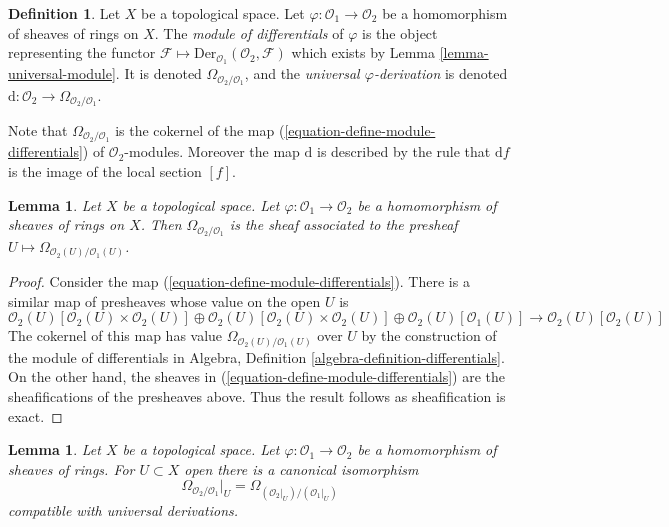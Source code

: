 \documentclass{stacks-project}
\theoremstyle{plain}
\newtheorem{lemma}[subsection]{Lemma}
\theoremstyle{definition}
\newtheorem{definition}[subsection]{Definition}
\theoremstyle{remark}
\numberwithin{equation}{subsection}
\begin{document}
\begin{definition}
\label{definition-module-differentials}
Let $X$ be a topological space. Let $\varphi : \mathcal{O}_1 \to \mathcal{O}_2$
be a homomorphism of sheaves of rings on $X$. The {\it module of differentials}
of $\varphi$ is the object representing the functor
$\mathcal{F} \mapsto \text{Der}_{\mathcal{O}_1}(\mathcal{O}_2, \mathcal{F})$
which exists by Lemma \ref{lemma-universal-module}.
It is denoted $\Omega_{\mathcal{O}_2/\mathcal{O}_1}$, and the {\it universal
$\varphi$-derivation} is denoted
$\text{d} : \mathcal{O}_2 \to \Omega_{\mathcal{O}_2/\mathcal{O}_1}$.
\end{definition}

\noindent
Note that $\Omega_{\mathcal{O}_2/\mathcal{O}_1}$ is the cokernel of
the map (\ref{equation-define-module-differentials}) of
$\mathcal{O}_2$-modules. Moreover the map $\text{d}$ is described
by the rule that $\text{d}f$ is the image of the local section $[f]$.

\begin{lemma}
\label{lemma-differentials-sheafify}
Let $X$ be a topological space. Let $\varphi : \mathcal{O}_1 \to \mathcal{O}_2$
be a homomorphism of sheaves of rings on $X$. Then
$\Omega_{\mathcal{O}_2/\mathcal{O}_1}$ is the sheaf associated to the
presheaf $U \mapsto \Omega_{\mathcal{O}_2(U)/\mathcal{O}_1(U)}$.
\end{lemma}

\begin{proof}
Consider the map (\ref{equation-define-module-differentials}). There is
a similar map of presheaves whose value on the open $U$ is
$$
\mathcal{O}_2(U)[\mathcal{O}_2(U) \times \mathcal{O}_2(U)] \oplus
\mathcal{O}_2(U)[\mathcal{O}_2(U) \times \mathcal{O}_2(U)] \oplus
\mathcal{O}_2(U)[\mathcal{O}_1(U)]
\longrightarrow
\mathcal{O}_2(U)[\mathcal{O}_2(U)]
$$
The cokernel of this map has value $\Omega_{\mathcal{O}_2(U)/\mathcal{O}_1(U)}$
over $U$ by the construction of the module of differentials in 
Algebra, Definition \ref{algebra-definition-differentials}.
On the other hand, the sheaves in (\ref{equation-define-module-differentials})
are the sheafifications of the presheaves above. Thus the result follows
as sheafification is exact.
\end{proof}

\begin{lemma}
\label{lemma-localize-differentials}
Let $X$ be a topological space. Let $\varphi : \mathcal{O}_1 \to \mathcal{O}_2$
be a homomorphism of sheaves of rings. For $U \subset X$ open
there is a canonical isomorphism
$$
\Omega_{\mathcal{O}_2/\mathcal{O}_1}|_U =
\Omega_{(\mathcal{O}_2|_U)/(\mathcal{O}_1|_U)}
$$
compatible with universal derivations.
\end{lemma}
\end{document}
